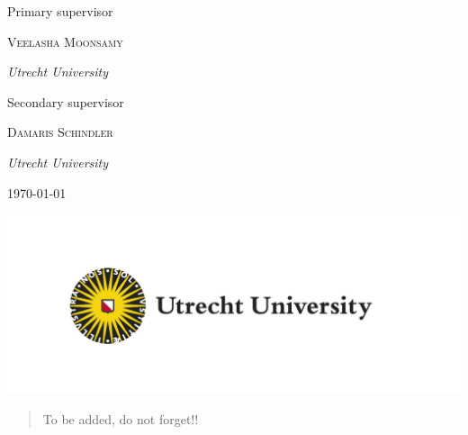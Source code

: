 \documentclass[12pt,a4paper]{report}
\theoremstyle{plain}
\theoremstyle{definition}
\begin{document}
\begin{titlepage}
		\vspace*{2\baselineskip} %
		
		
		Primary supervisor
		
		\vspace{0.5\baselineskip} %
		
		{\scshape\Large Veelasha Moonsamy} %
		
		\vspace{0.5\baselineskip} %
		
		\textit{Utrecht University} %
		
		\vspace*{1\baselineskip} %
		
		
		Secondary supervisor
		
		\vspace{0.5\baselineskip} %
		
		{\scshape\Large Damaris Schindler} %
		
		\vspace{0.5\baselineskip} %
		
		\textit{Utrecht University} %
		
		\vspace{3\baselineskip} %
		
		\today
		
		\includegraphics{UU_logo_EN_CMYK}
	\end{titlepage}
	\begin{abstract}
		To be added, do not forget!!
	\end{abstract}
	\tableofcontents
	
	
	
	
	
	
	
	
	
	\appendix
	
\end{document}
